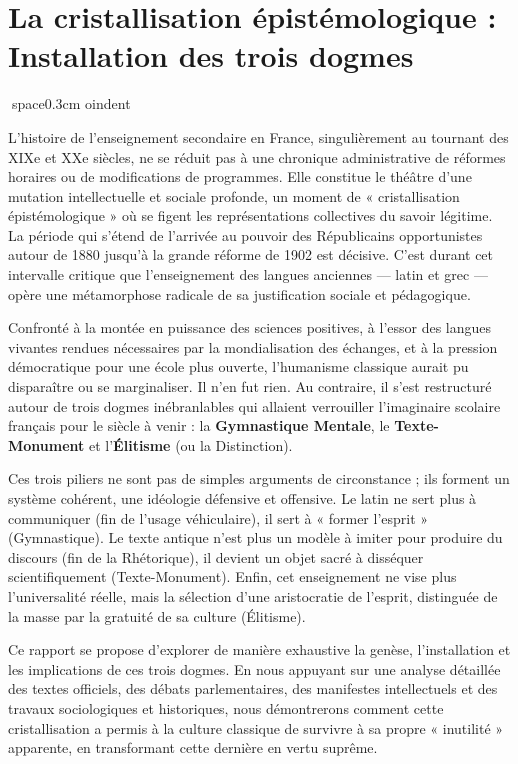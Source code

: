 

\section{La cristallisation épistémologique : Installation des trois dogmes}
space{0.3cm}
oindent

L'histoire de l'enseignement secondaire en France, singulièrement au tournant des XIXe et XXe
siècles, ne se réduit pas à une chronique administrative de réformes horaires ou de modifications de
programmes. Elle constitue le théâtre d'une mutation intellectuelle et sociale profonde, un moment
de « cristallisation épistémologique » où se figent les représentations collectives du savoir
légitime. La période qui s'étend de l'arrivée au pouvoir des Républicains opportunistes autour de
1880 jusqu'à la grande réforme de 1902 est décisive. C'est durant cet intervalle critique que
l'enseignement des langues anciennes — latin et grec — opère une métamorphose radicale de sa
justification sociale et pédagogique.

Confronté à la montée en puissance des sciences positives, à l'essor des langues vivantes rendues
nécessaires par la mondialisation des échanges, et à la pression démocratique pour une école plus
ouverte, l'humanisme classique aurait pu disparaître ou se marginaliser. Il n'en fut rien. Au
contraire, il s'est restructuré autour de trois dogmes inébranlables qui allaient verrouiller
l'imaginaire scolaire français pour le siècle à venir : la \textbf{Gymnastique Mentale}, le
\textbf{Texte-Monument} et l'\textbf{Élitisme} (ou la Distinction).

Ces trois piliers ne sont pas de simples arguments de circonstance ; ils forment un système
cohérent, une idéologie défensive et offensive. Le latin ne sert plus à communiquer (fin de l'usage
véhiculaire), il sert à « former l'esprit » (Gymnastique). Le texte antique n'est plus un modèle à
imiter pour produire du discours (fin de la Rhétorique), il devient un objet sacré à disséquer
scientifiquement (Texte-Monument). Enfin, cet enseignement ne vise plus l'universalité réelle, mais
la sélection d'une aristocratie de l'esprit, distinguée de la masse par la gratuité de sa culture
(Élitisme).

Ce rapport se propose d'explorer de manière exhaustive la genèse, l'installation et les implications
de ces trois dogmes. En nous appuyant sur une analyse détaillée des textes officiels, des débats
parlementaires, des manifestes intellectuels et des travaux sociologiques et historiques, nous
démontrerons comment cette cristallisation a permis à la culture classique de survivre à sa propre «
inutilité » apparente, en transformant cette dernière en vertu suprême.



